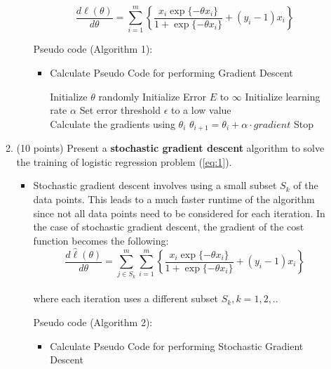 \documentclass[twoside,10pt]{article}
\begin{document}
\begin{enumerate}
\begin{enumerate}
\begin{itemize}
$$\frac{d\ell(\theta)}{d\theta} = \sum_{i=1}^m \left\{\frac{x_i\exp\{-\theta x_i\}}{1+\exp\{-\theta x_i\}} + (y_i-1)x_i\right\} $$

Pseudo code (Algorithm 1):
\begin{itemize}
\item
\begin{algorithm}
\caption{Calculate Pseudo Code for performing Gradient Descent}
\begin{algorithmic}

\STATE Initialize $\theta$ randomly
\STATE Initialize Error $E$ to $\infty$
\STATE Initialize learning rate $\alpha$
\STATE Set error threshold $\epsilon$ to a low value\\
\STATE 
{}
\STATE Calculate the gradients using $\theta_{i}$
\STATE $\theta_{i+1} = \theta_{i} + \alpha \cdot gradient$
\STATE Stop
\ENDIF

\ENDWHILE
\end{algorithmic}
\end{algorithm}
\end{itemize}








\end{itemize}
\item (10 points) Present a {\bf stochastic gradient descent} algorithm to solve the training of logistic regression problem (\ref{eq:1}). 

\begin{itemize}
\item Stochastic gradient descent involves using a small subset $S_k$ of the data points. This leads to a much faster runtime of the algorithm since not all data points need to be considered for each iteration. In the case of stochastic gradient descent, the gradient of the cost function becomes the following:\\
$$\frac{d\hat{\ell}(\theta)}{d\theta} = \sum_{j \in S_k}^m \sum_{i=1}^m \left\{\frac{x_i\exp\{-\theta x_i\}}{1+\exp\{-\theta x_i\}} + (y_i-1)x_i\right\} $$\\
where each iteration uses a different subset $S_k, k = 1,2,..$

Pseudo code (Algorithm 2):
\begin{itemize}
\item
\begin{algorithm}
\caption{Calculate Pseudo Code for performing Stochastic Gradient Descent}
\begin{algorithmic}


\end{algorithmic}
\end{algorithm}
\end{itemize}
\end{itemize}
\end{enumerate}
\end{enumerate}
\end{document}

